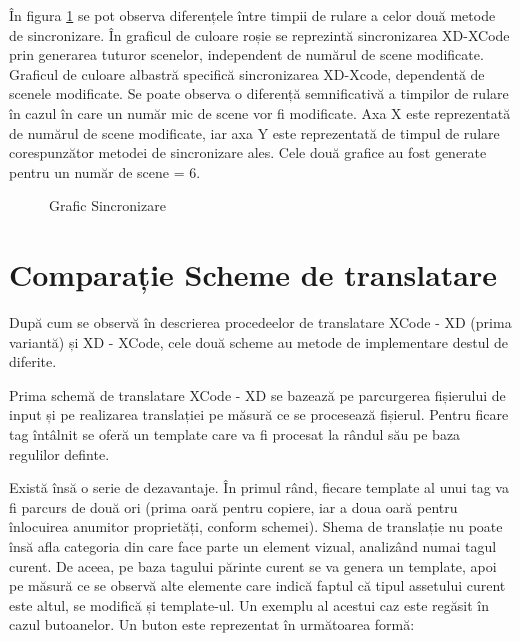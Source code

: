 În figura \ref{fig:GraficSinc2} se pot observa diferențele între timpii de rulare a celor două metode de sincronizare. În graficul de culoare roșie se reprezintă sincronizarea XD-XCode prin generarea tuturor scenelor, independent de numărul de scene modificate. Graficul de culoare albastră specifică sincronizarea XD-Xcode, dependentă de scenele modificate. Se poate observa o diferență semnificativă a timpilor de rulare în cazul în care un număr mic de scene vor fi modificate. Axa X este reprezentată de numărul de scene modificate, iar axa Y este reprezentată de timpul de rulare corespunzător metodei de sincronizare ales. Cele două grafice au fost generate pentru un număr de scene = 6.

\begin{figure}[!htbp]
\centering
{}
\caption{Grafic Sincronizare} \label{fig:GraficSinc2}
\end{figure}

\section{Comparație Scheme de translatare}

După cum se observă în descrierea procedeelor de translatare XCode - XD  (prima variantă) și XD - XCode, cele două scheme au metode de implementare destul de diferite. 

Prima schemă de translatare XCode - XD se bazează pe parcurgerea fișierului de input și pe realizarea translației pe măsură ce se procesează fișierul. Pentru ficare tag întâlnit se oferă un template care va fi procesat la rândul său pe baza regulilor definte. 

Există însă o serie de dezavantaje. În primul rând, fiecare template al unui tag va fi parcurs de două ori (prima oară pentru copiere, iar a doua oară pentru înlocuirea anumitor proprietăți, conform schemei). 
Shema de translație nu poate însă afla categoria din care face parte un element vizual, analizând numai tagul curent. De aceea, pe baza tagului părinte curent se va genera un template, apoi pe măsură ce se observă alte elemente care indică faptul că tipul assetului curent este altul, se modifică și template-ul. Un exemplu al acestui caz este regăsit în cazul butoanelor. Un buton este reprezentat în următoarea formă:

